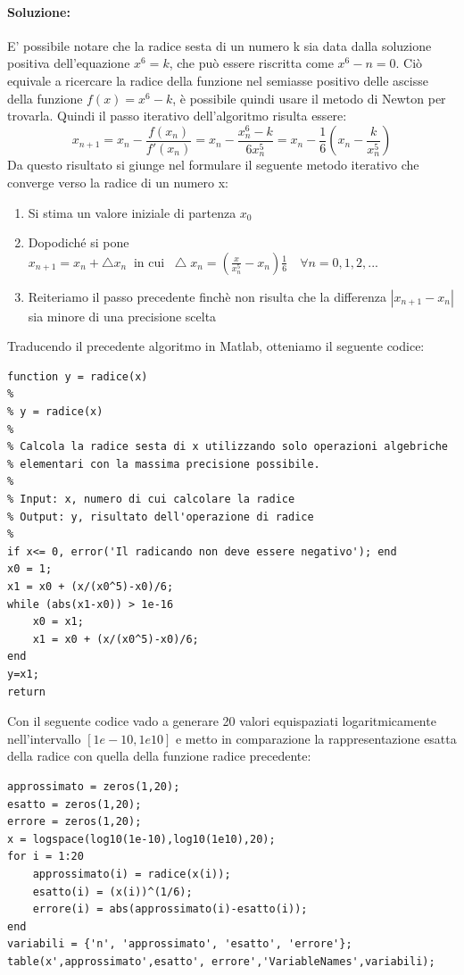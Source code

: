 \documentclass[12pt]{article}
\begin{document}
\paragraph{Soluzione:}
E' possibile notare che la radice sesta di un numero k sia data dalla soluzione positiva dell'equazione \( x^6 = k \), che può essere riscritta come \( x^6 - n= 0 \).
Ciò equivale a ricercare la radice della funzione nel semiasse positivo delle ascisse della funzione \(f(x)=x^6-k\), è possibile quindi usare il metodo di Newton per trovarla.
Quindi il passo iterativo dell'algoritmo risulta essere:
$$x_{n+1}=x_n - \frac{f(x_n)}{f'(x_n)} = x_n - \frac{x_n^6 - k}{6x_n^5} = x_n - \frac{1}{6}(x_n - \frac{k}{x_n^5})$$
Da questo risultato si giunge nel formulare il seguente metodo iterativo che converge verso la radice di un numero x:
\begin{enumerate}
    \item Si stima un valore iniziale di partenza \(x_0\)
    \item Dopodiché si pone \(x_{n+1}=x_n + \bigtriangleup x_n\;\; \text{in cui}\;\; \bigtriangleup x_n = (\frac{x}{x^{5}_n}-x_n)\frac{1}{6} \quad \forall n=0,1,2,...\)
    \item Reiteriamo il passo precedente finchè non risulta che la differenza \(|x_{n+1}-x_n|\)  sia minore di una precisione scelta
\end{enumerate}
Traducendo il precedente algoritmo in Matlab, otteniamo il seguente codice:
\begin{lstlisting}[frame=single]
function y = radice(x)
% 
% y = radice(x)
% 
% Calcola la radice sesta di x utilizzando solo operazioni algebriche
% elementari con la massima precisione possibile.
% 
% Input: x, numero di cui calcolare la radice
% Output: y, risultato dell'operazione di radice
%
if x<= 0, error('Il radicando non deve essere negativo'); end
x0 = 1;
x1 = x0 + (x/(x0^5)-x0)/6;
while (abs(x1-x0)) > 1e-16
    x0 = x1;
    x1 = x0 + (x/(x0^5)-x0)/6;
end
y=x1;
return
\end{lstlisting}
Con il seguente codice vado a generare 20 valori equispaziati logaritmicamente nell'intervallo \([1e-10,1e10]\) e metto in comparazione la rappresentazione esatta della radice con
quella della funzione radice precedente:
\begin{lstlisting}[frame=single]
approssimato = zeros(1,20);
esatto = zeros(1,20);
errore = zeros(1,20);
x = logspace(log10(1e-10),log10(1e10),20);
for i = 1:20
    approssimato(i) = radice(x(i));
    esatto(i) = (x(i))^(1/6);
    errore(i) = abs(approssimato(i)-esatto(i));
end
variabili = {'n', 'approssimato', 'esatto', 'errore'};
table(x',approssimato',esatto', errore','VariableNames',variabili);  
\end{lstlisting}
\end{document}
